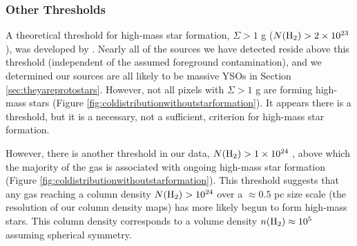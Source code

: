 \documentclass[twocolumn]{aastex61}
\begin{document}




\subsubsection{Other Thresholds}
\label{sec:otherthresholds}

A theoretical threshold for high-mass star formation, $\Sigma > 1$ g \persc
($N(\textrm{H}_{2}) > 2\times10^{23}$ \persc), was developed by \citet{Krumholz2008a}.   Nearly
all of the sources we have detected reside above this threshold (independent of
the assumed foreground contamination), and we determined our sources are all
likely to be massive YSOs in Section \ref{sec:theyareprotostars}.
However, not all pixels with $\Sigma > 1$ g \persc are forming high-mass stars
(Figure \ref{fig:coldistributionwithoutstarformation}).  It appears
there is a threshold, but it is a necessary, not a sufficient, criterion
for high-mass star formation.

However, there is another threshold in our data, $N(\textrm{H}_{2})>1\times10^{24}$ \persc,
above which the majority of the gas is associated with ongoing high-mass star
formation (Figure \ref{fig:coldistributionwithoutstarformation}).  This
threshold suggests that any gas reaching a column density $N(\textrm{H}_{2})>10^{24}$
\persc over a $\approx0.5$ pc size scale (the resolution of our column density
maps) has more likely begun to form high-mass stars.  This column
density corresponds to a volume density $n(\textrm{H}_{2})\approx10^5$ \percc assuming
spherical symmetry.
\end{document}
